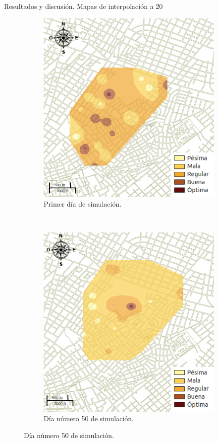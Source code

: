\begin{frame}[t]{Resultados y discusión. Mapas de interpolación a 20 \textcelsius}
    \begin{figure}
    \begin{subfigure}[b]{0.45\textwidth}
        \includegraphics[width=\textwidth]{./graphics/inicial.png}
        \caption{ Primer día de simulación.}
    \end{subfigure}
    ~~~~
    \begin{subfigure}[b]{0.45\textwidth}
        \includegraphics[width=\textwidth]{./graphics/temp-20-final.png}
        \caption{Día número 50 de simulación.}
    \end{subfigure}
    \end{figure}
\end{frame}

